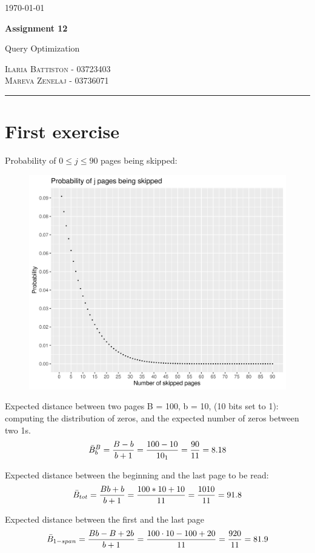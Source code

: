 \documentclass[12pt]{article}
\begin{document}
	\begin{flushright}
		\today
	\end{flushright}
	{\Large \textbf{Assignment 12}}
	
	{\large Query Optimization}
	
	\textsc{Ilaria Battiston - 03723403} \\
	\textsc{Mareva Zenelaj - 03736071}
	
	\rule{\linewidth}{0.5pt}
	
	\section{First exercise}
	Probability of $0 \leq j \leq 90$ pages being skipped:
	\begin{figure}[h]
		\includegraphics[scale=0.7]{plot_skipped.png}
		\centering
	\end{figure}
	    
	Expected distance between two pages B = 100, b = 10, (10 bits set to 1): computing the distribution of zeros, and the expected number of zeros between two 1s.
	$$\Bar{B}_b^B = \frac{B-b}{b+1} = \frac{100-10}{10_1} = \frac{90}{11} = 8.18$$
	    
	Expected distance between the beginning and the last page to be read:
	$$\Bar{B}_{tot} = \frac{Bb +b}{b+1} = \frac{100*10 + 10}{11} = \frac{1010}{11} = 91.8$$
	    
	Expected distance between the first and the last page
	$$\Bar{B}_{1-span} = \frac{Bb-B+2b}{b+1} = \frac{100 \cdot 10-100+20}{11} = \frac{920}{11} =81.9$$
	
\end{document}
